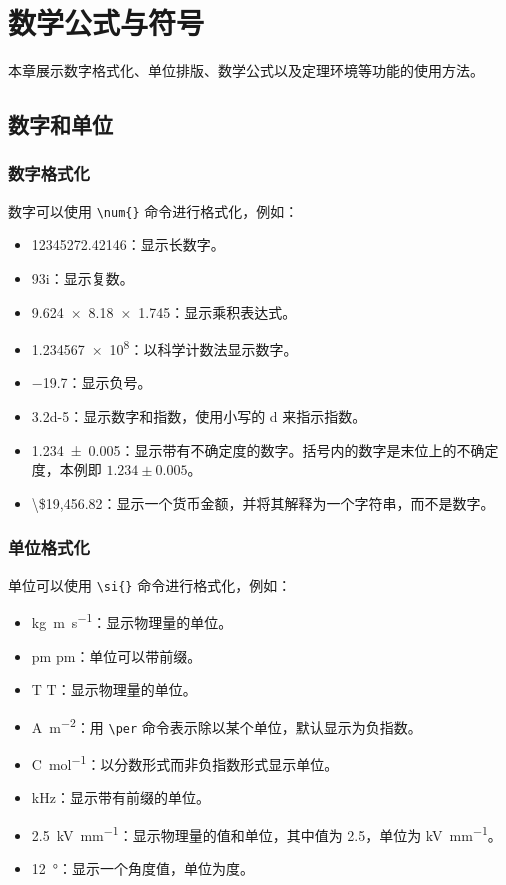\chapter{数学公式与符号}\label{chap:math}

本章展示数字格式化、单位排版、数学公式以及定理环境等功能的使用方法。

\section{数字和单位}

\subsection{数字格式化}

数字可以使用 \verb|\num{}| 命令进行格式化，例如：

\begin{itemize}
  \item \num{12345272.42146}：显示长数字。
  \item \num{9+3i}：显示复数。
  \item \num{9.624 x 8.18 x 1.745}：显示乘积表达式。
  \item \num{1.234567e8}：以科学计数法显示数字。
  \item \num{-19.7}：显示负号。
  \item \num{3.2d-5}：显示数字和指数，使用小写的 d 来指示指数。
  \item \num{1.234(5)}：显示带有不确定度的数字。括号内的数字是末位上的不确定度，本例即 $1.234 \pm 0.005$。
  \item \num[parse-numbers=false]{\$19,456.82}：显示一个货币金额，并将其解释为一个字符串，而不是数字。
\end{itemize}

\subsection{单位格式化}

单位可以使用 \verb|\si{}| 命令进行格式化，例如：

\begin{itemize}
  \item \si{kg.m.s^{-1}}：显示物理量的单位。
  \item \si{\pico\meter} $\si{\pico\meter}$：单位可以带前缀。
  \item \si{\tesla} $\si{\tesla}$：显示物理量的单位。
  \item \si{\ampere\per\meter\squared}：用 \verb|\per| 命令表示除以某个单位，默认显示为负指数。
  \item \si[per-mode=fraction]{\coulomb\per\mole}：以分数形式而非负指数形式显示单位。
  \item \si{\kilo\hertz}：显示带有前缀的单位。
  \item \SI{2.5}{\kilo\volt\per\milli\meter}：显示物理量的值和单位，其中值为 2.5，单位为 \si{\kilo\volt\per\milli\meter}。
  \item \SI{12}{\degree}：显示一个角度值，单位为度。
\end{itemize}

